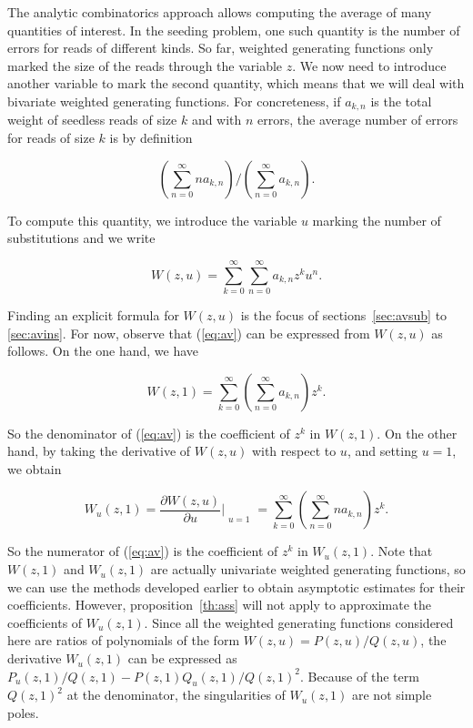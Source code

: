 \documentclass{article}
\begin{document}
The analytic combinatorics approach allows computing the average of many
quantities of interest. In the seeding problem, one such quantity is the
number of errors for reads of different kinds. So far, weighted generating
functions only marked the size of the reads through the variable $z$. We
now need to introduce another variable to mark the second quantity, which
means that we will deal with bivariate weighted generating functions. For
concreteness, if $a_{k,n}$ is the total weight of seedless reads of size
$k$ and with $n$ errors, the average number of errors for reads of size
$k$ is by definition


\begin{equation}
\label{eq:av}
\left( \sum_{n=0}^\infty na_{k,n} \right) \Big/
 \left( \sum_{n=0}^\infty a_{k,n} \right).
\end{equation}

To compute this quantity, we introduce the variable $u$ marking the number
of substitutions and we write

\begin{equation*}
W(z,u) = \sum_{k=0}^\infty\sum_{n=0}^\infty a_{k,n}z^ku^n.
\end{equation*}

Finding an explicit formula for $W(z,u)$ is the focus of
sections~\ref{sec:avsub} to \ref{sec:avins}. For now, observe that
(\ref{eq:av}) can be expressed from $W(z,u)$ as follows. On the
one hand, we have

\begin{equation*}
W(z,1) = \sum_{k=0}^\infty \left( \sum_{n=0}^\infty a_{k,n} \right) z^k.
\end{equation*}

So the denominator of (\ref{eq:av}) is the coefficient of $z^k$ in
$W(z,1)$. On the other hand, by taking the derivative of $W(z,u)$ with
respect to $u$, and setting $u=1$, we obtain

\begin{equation*}
W_u(z,1) = \frac{\partial W(z,u)}{\partial u} \Bigr|_{\substack{\\u=1}} =
\sum_{k=0}^\infty \left( \sum_{n=0}^\infty na_{k,n} \right) z^k.
\end{equation*}

So the numerator of (\ref{eq:av}) is the coefficient of $z^k$ in
$W_u(z,1)$. Note that $W(z,1)$ and $W_u(z,1)$ are actually univariate
weighted generating functions, so we can use the methods developed earlier
to obtain asymptotic estimates for their coefficients. However,
proposition~\ref{th:ass} will not apply to approximate the coefficients of
$W_u(z,1)$. Since all the weighted generating functions considered here
are ratios of polynomials of the form $W(z,u) = P(z,u)/Q(z,u)$, the
derivative $W_u(z,1)$ can be expressed as $P_u(z,1)/Q(z,1) -
P(z,1)Q_u(z,1)/Q(z,1)^2$. Because of the term $Q(z,1)^2$ at the
denominator, the singularities of $W_u(z,1)$ are not simple poles.
\end{document}
